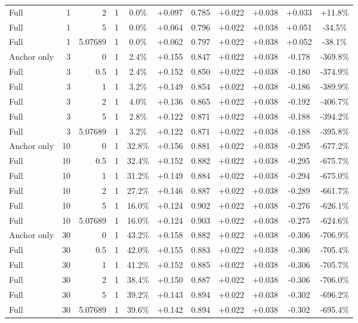 \begin{table}[htbp]
\begin{tabular}{lrrrccccccc}
Full & 1 & 2 & 1 & 0.0\% & +0.097 & 0.785 & +0.022 & +0.038 & +0.033 & +11.8\% \\
Full & 1 & 5 & 1 & 0.0\% & +0.064 & 0.796 & +0.022 & +0.038 & +0.051 & -34.5\% \\
Full & 1 & 5.07689 & 1 & 0.0\% & +0.062 & 0.797 & +0.022 & +0.038 & +0.052 & -38.1\% \\
Anchor only & 3 & 0 & 1 & 2.4\% & +0.155 & 0.847 & +0.022 & +0.038 & -0.178 & -369.8\% \\
Full & 3 & 0.5 & 1 & 2.4\% & +0.152 & 0.850 & +0.022 & +0.038 & -0.180 & -374.9\% \\
Full & 3 & 1 & 1 & 3.2\% & +0.149 & 0.854 & +0.022 & +0.038 & -0.186 & -389.9\% \\
Full & 3 & 2 & 1 & 4.0\% & +0.136 & 0.865 & +0.022 & +0.038 & -0.192 & -406.7\% \\
Full & 3 & 5 & 1 & 2.8\% & +0.122 & 0.871 & +0.022 & +0.038 & -0.188 & -394.2\% \\
Full & 3 & 5.07689 & 1 & 3.2\% & +0.122 & 0.871 & +0.022 & +0.038 & -0.188 & -395.8\% \\
Anchor only & 10 & 0 & 1 & 32.8\% & +0.156 & 0.881 & +0.022 & +0.038 & -0.295 & -677.2\% \\
Full & 10 & 0.5 & 1 & 32.4\% & +0.152 & 0.882 & +0.022 & +0.038 & -0.295 & -675.7\% \\
Full & 10 & 1 & 1 & 31.2\% & +0.149 & 0.884 & +0.022 & +0.038 & -0.294 & -675.0\% \\
Full & 10 & 2 & 1 & 27.2\% & +0.146 & 0.887 & +0.022 & +0.038 & -0.289 & -661.7\% \\
Full & 10 & 5 & 1 & 16.0\% & +0.124 & 0.902 & +0.022 & +0.038 & -0.276 & -626.1\% \\
Full & 10 & 5.07689 & 1 & 16.0\% & +0.124 & 0.903 & +0.022 & +0.038 & -0.275 & -624.6\% \\
Anchor only & 30 & 0 & 1 & 43.2\% & +0.158 & 0.882 & +0.022 & +0.038 & -0.306 & -706.9\% \\
Full & 30 & 0.5 & 1 & 42.0\% & +0.155 & 0.883 & +0.022 & +0.038 & -0.306 & -705.4\% \\
Full & 30 & 1 & 1 & 41.2\% & +0.152 & 0.885 & +0.022 & +0.038 & -0.306 & -705.7\% \\
Full & 30 & 2 & 1 & 38.4\% & +0.150 & 0.887 & +0.022 & +0.038 & -0.306 & -706.0\% \\
Full & 30 & 5 & 1 & 39.2\% & +0.143 & 0.894 & +0.022 & +0.038 & -0.302 & -696.2\% \\
Full & 30 & 5.07689 & 1 & 39.6\% & +0.142 & 0.894 & +0.022 & +0.038 & -0.302 & -695.4\% \\

\end{tabular}
\end{table}
